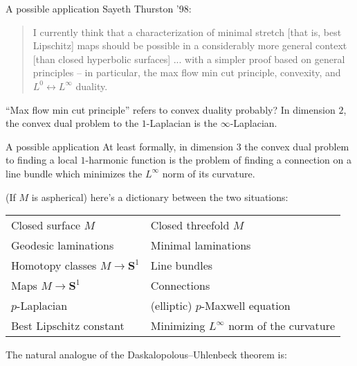 \documentclass[10pt]{beamer}
\newcommand{\Sph}{\mathbf S}
\begin{document}
\begin{frame}{A possible application}
Sayeth Thurston '98:

\begin{quote}
I currently think that a characterization of minimal stretch [that is, best Lipschitz] maps should be possible in a considerably more general context [than closed hyperbolic surfaces] ... with a simpler proof based on general principles -- in particular, the max flow min cut principle, convexity, and $L^0 \leftrightarrow L^\infty$ duality.
\end{quote}
    
``Max flow min cut principle'' refers to convex duality probably?
In dimension $2$, the convex dual problem to the $1$-Laplacian is the $\infty$-Laplacian.
\end{frame}

\begin{frame}{A possible application}
At least formally, in dimension $3$ the convex dual problem to finding a local $1$-harmonic function is the problem of finding a connection on a line bundle which minimizes the $L^\infty$ norm of its curvature. \pause

(If $M$ is aspherical) here's a dictionary between the two situations:

\begin{table}[]
\begin{tabular}{ll}
Closed surface $M$                                              & Closed threefold $M$                         \\
Geodesic laminations                                            & Minimal laminations                          \\
Homotopy classes $M \to \Sph^1$ & Line bundles \\
Maps $M \to \Sph^1$                                             & Connections                                  \\
$p$-Laplacian                                                   & (elliptic) $p$-Maxwell equation              \\
Best Lipschitz constant                                         & Minimizing $L^\infty$ norm of the curvature 
\end{tabular}
\end{table} \pause 

The natural analogue of the Daskalopolous--Uhlenbeck theorem is:
\end{frame}
\end{document}
